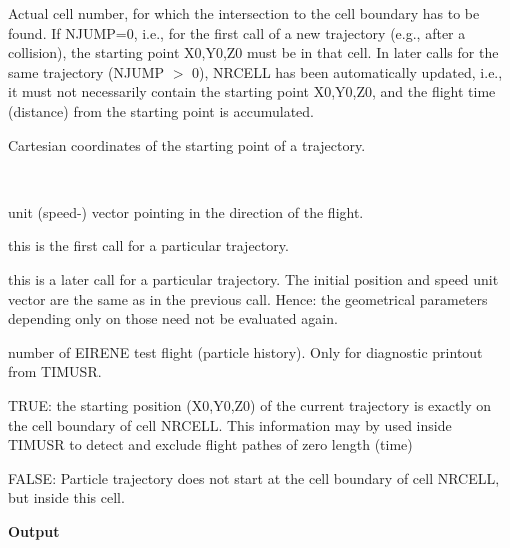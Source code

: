 \begin{list}{ }{}
\item[{\bf NRCELL }]
Actual cell number, for which the intersection to the cell boundary has to be found.
If NJUMP=0, i.e., for the first call of a new trajectory (e.g., after a
collision), the starting point X0,Y0,Z0 must be in that cell.
In later calls for the same trajectory (NJUMP $>$ 0), NRCELL has been automatically updated,
i.e., it must not necessarily contain the starting point
X0,Y0,Z0, and the flight time (distance) from the starting point is accumulated.
\item[{\bf X0,Y0,Z0 }]
Cartesian coordinates of the starting point of a trajectory.
\item[{\bf VELX,VELY,VELZ }]~

unit (speed-) vector pointing in the
direction of the flight.
\item[{\bf NJUMP }]
\begin{list}{ }{}
\item[{\bf $= 0$ }]
this is the first call for a particular trajectory.
\item[{\bf $\neq 0$ }]
this is a later call for a particular trajectory. The initial position and
speed unit vector are the same as in the previous call. Hence: the geometrical
parameters depending only on those need not be evaluated again.
\end{list}
\item[{\bf NPANU }]
number of EIRENE test flight (particle history). Only for diagnostic printout from TIMUSR.
\item[{\bf NLSRFX }]
TRUE:  the starting position (X0,Y0,Z0) of the current trajectory is exactly on the cell boundary of cell
NRCELL.  This information may by used inside TIMUSR
to detect and exclude flight pathes of zero length (time)

FALSE:  Particle trajectory does not start at the cell boundary of cell NRCELL, but inside this cell.
\end{list}

{\bf Output}

